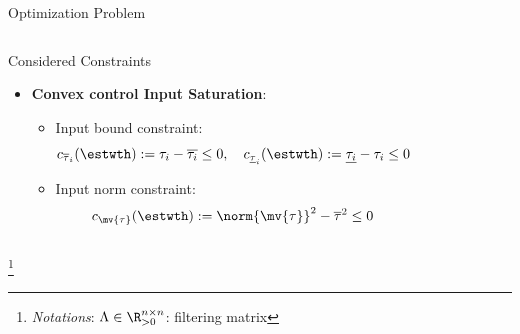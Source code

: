 \documentclass[8pt, aspectratio=169, handout]{beamer}
\begin{document}
\begin{frame}{\insertsubsectionhead}{Optimization Problem}
\begin{columns}
\begin{block}{Considered Constraints}
\begin{itemize}
        \item \textbf{Convex control Input Saturation}: 
          \begin{itemize}
            \item Input bound constraint:
            \begin{equation}\label{eq:cstr:input_bound}
              c_{\overline{\tau}_i}(\estwth)
              :=
              \tau_i - \overline{\tau_i}
              \le 
              0
              ,
              \quad
              c_{\underline{\tau}_i}(\estwth)
              :=
              \underline{\tau_i} - \tau_i
              \le 
              0
            \end{equation}
            \item Input norm constraint:
            \begin{equation}\label{eq:cstr:input_norm}
              c_{\mv{\tau}}(\estwth)
              :=
              \norm{\mv{\tau}}^2 - \overline{\tau}^2
              \le
              0
            \end{equation}
        \end{itemize}
      \end{itemize}
      
    \end{block}

  \end{columns}

  \let\thefootnote\relax\footnote{
    \textit{Notations}: 
    $\Lambda\in\R_{>0}^{n\times n}$: filtering matrix
  }

\end{frame}
\end{document}

